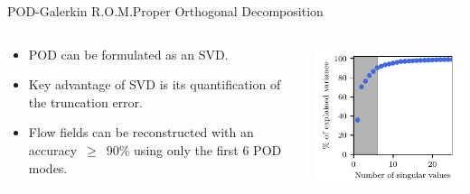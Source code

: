 \documentclass[usenames,dvipsnames,svgnames,10pt,aspectratio=169]{beamer}
\begin{document}
\begin{frame}[t, c]{POD-Galerkin R.O.M.}{Proper Orthogonal Decomposition}
	\begin{columns}
		\begin{column}{.5\textwidth}
			\begin{itemize}
				\item POD can be formulated as an SVD.
				\bigskip
				\item Key advantage of SVD is its quantification of the truncation error.
				\bigskip
				\item Flow fields can be reconstructed with an accuracy~$\ge$~90\% using only the first 6 POD modes.
			\end{itemize}
			\vspace{1cm}
		\end{column}
		\begin{column}{.5\textwidth}
			\centering
			\includegraphics[width=.66\columnwidth]{svd_explained_variance}
		\end{column}
	\end{columns}
\end{frame}
\end{document}
